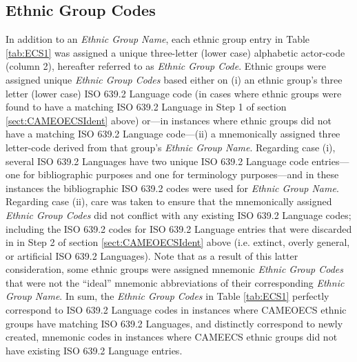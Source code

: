 \documentclass[12pt]{article}
\begin{document}
\subsection{Ethnic Group Codes}
In addition to an \textit{Ethnic Group Name}, each ethnic group entry in Table \ref{tab:ECS1} was assigned a unique three-letter (lower case) alphabetic actor-code (column 2), hereafter referred to as \textit{Ethnic Group Code}.  Ethnic groups were assigned unique \textit{Ethnic Group Codes} based either on (i) an ethnic group's three letter (lower case) ISO 639.2 Language code (in cases where ethnic groups were found to have a matching ISO 639.2 Language in Step 1 of section \ref{sect:CAMEOECSIdent} above) or---in instances where ethnic groups did not have a matching ISO 639.2 Language code---(ii) a mnemonically assigned three letter-code derived from that group's \textit{Ethnic Group Name}.  Regarding case (i), several ISO 639.2 Languages have two unique ISO 639.2 Language code entries---one for bibliographic purposes and one for terminology purposes---and in these instances the bibliographic ISO 639.2 codes were used for \textit{Ethnic Group Name}.  Regarding case (ii), care was taken to ensure that the mnemonically assigned \textit{Ethnic Group Codes} did not conflict with any existing ISO 639.2 Language codes; including the ISO 639.2 codes for ISO 639.2 Language entries that were discarded in in Step 2 of section \ref{sect:CAMEOECSIdent} above (i.e. extinct, overly general, or artificial ISO 639.2 Languages).  Note that as a result of this latter consideration, some ethnic groups were assigned mnemonic \textit{Ethnic Group Codes} that were not the ``ideal'' mnemonic abbreviations of their corresponding \textit{Ethnic Group Name}.  In sum, the \textit{Ethnic Group Codes} in Table \ref{tab:ECS1} perfectly correspond to ISO 639.2 Language codes in instances where CAMEOECS ethnic groups have matching ISO 639.2 Languages, and distinctly correspond to newly created, mnemonic codes in instances where CAMEECS ethnic groups did not have existing ISO 639.2 Language entries.
\end{document}
